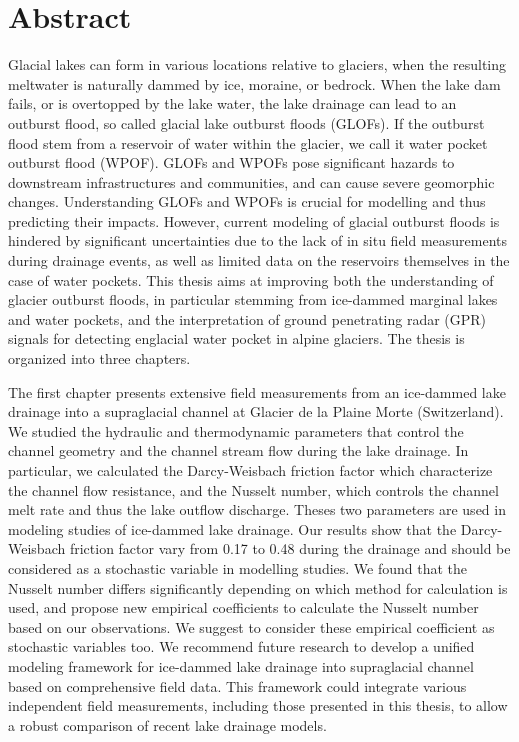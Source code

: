 \begingroup
\let\clearpage\relax
\let\cleardoublepage\relax
\let\cleardoublepage\relax

\chapter*{Abstract}


Glacial lakes can form in various locations relative to glaciers, when the resulting meltwater is naturally dammed by ice, moraine, or bedrock. When the lake dam fails, or is overtopped by the lake water, the lake drainage can lead to an outburst flood, so called glacial lake outburst floods (GLOFs). If the outburst flood stem from a reservoir of water within the glacier, we call it water pocket outburst flood (WPOF). GLOFs and WPOFs pose significant hazards to downstream infrastructures and communities, and can cause severe geomorphic changes. Understanding GLOFs and WPOFs is crucial for modelling and thus predicting their impacts. However, current modeling of glacial outburst floods is hindered by significant uncertainties due to the lack of in situ field measurements during drainage events, as well as limited data on the reservoirs themselves in the case of water pockets. This thesis aims at improving both the understanding of glacier outburst floods, in particular stemming from ice-dammed marginal lakes and water pockets, and the interpretation of ground penetrating radar (GPR) signals for detecting englacial water pocket in alpine glaciers. The thesis is organized into three chapters.
%

The first chapter presents extensive field measurements from an ice-dammed lake drainage into a supraglacial channel at Glacier de la Plaine Morte (Switzerland). We studied the hydraulic and thermodynamic parameters that control the channel geometry and the channel stream flow during the lake drainage. In particular, we calculated the Darcy-Weisbach friction factor which characterize the channel flow resistance, and the Nusselt number, which controls the channel melt rate and thus the lake outflow discharge. Theses two parameters are used in modeling studies of ice-dammed lake drainage. Our results show that the Darcy-Weisbach friction factor vary from 0.17 to 0.48 during the drainage and should be considered as a stochastic variable in modelling studies. We found that the Nusselt number differs significantly depending on which method for calculation is used, and propose new empirical coefficients to calculate the Nusselt number based on our observations. We suggest to consider these empirical coefficient as stochastic variables too. We recommend future research to develop a unified modeling framework for ice-dammed lake drainage into supraglacial channel based on comprehensive field data. This framework could integrate various independent field measurements, including those presented in this thesis, to allow a robust comparison of recent lake drainage models.
%


